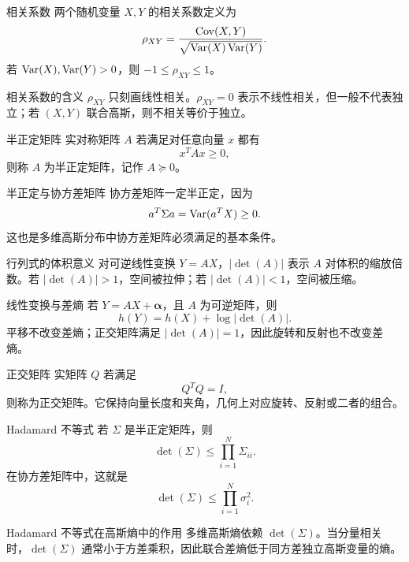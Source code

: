 \begin{definitionBox}{相关系数}
两个随机变量 $X,Y$ 的相关系数定义为
\[
\rho_{XY}=\frac{\operatorname{Cov}(X,Y)}{\sqrt{\operatorname{Var}(X)\operatorname{Var}(Y)}}.
\]
若 $\operatorname{Var}(X),\operatorname{Var}(Y)>0$，则 $-1\le\rho_{XY}\le1$。
\end{definitionBox}

\begin{keypoint}{相关系数的含义}
$\rho_{XY}$ 只刻画线性相关。$\rho_{XY}=0$ 表示不线性相关，但一般不代表独立；若 $(X,Y)$ 联合高斯，则不相关等价于独立。
\end{keypoint}

\begin{definitionBox}{半正定矩阵}
实对称矩阵 $A$ 若满足对任意向量 $x$ 都有
\[
x^T A x\ge0,
\]
则称 $A$ 为半正定矩阵，记作 $A\succeq0$。
\end{definitionBox}

\begin{keypoint}{半正定与协方差矩阵}
协方差矩阵一定半正定，因为
\[
a^T\Sigma a=\operatorname{Var}(a^TX)\ge0.
\]
这也是多维高斯分布中协方差矩阵必须满足的基本条件。
\end{keypoint}

\begin{definitionBox}{行列式的体积意义}
对可逆线性变换 $Y=AX$，$|\det(A)|$ 表示 $A$ 对体积的缩放倍数。若 $|\det(A)|>1$，空间被拉伸；若 $|\det(A)|<1$，空间被压缩。
\end{definitionBox}

\begin{formulaBox}{线性变换与差熵}
若 $Y=AX+\bm{\alpha}$，且 $A$ 为可逆矩阵，则
\[
h(Y)=h(X)+\log|\det(A)|.
\]
平移不改变差熵；正交矩阵满足 $|\det(A)|=1$，因此旋转和反射也不改变差熵。
\end{formulaBox}

\begin{definitionBox}{正交矩阵}
实矩阵 $Q$ 若满足
\[
Q^TQ=I,
\]
则称为正交矩阵。它保持向量长度和夹角，几何上对应旋转、反射或二者的组合。
\end{definitionBox}

\begin{formulaBox}{Hadamard 不等式}
若 $\Sigma$ 是半正定矩阵，则
\[
\det(\Sigma)\le\prod_{i=1}^N \Sigma_{ii}.
\]
在协方差矩阵中，这就是
\[
\det(\Sigma)\le\prod_{i=1}^N \sigma_i^2.
\]
\end{formulaBox}

\begin{keypoint}{Hadamard 不等式在高斯熵中的作用}
多维高斯熵依赖 $\det(\Sigma)$。当分量相关时，$\det(\Sigma)$ 通常小于方差乘积，因此联合差熵低于同方差独立高斯变量的熵。
\end{keypoint}

